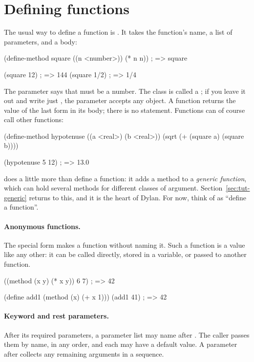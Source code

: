 \section{Defining functions}\label{sec:tut-functions}

The usual way to define a function is . It takes the
function's name, a list of parameters, and a body:

\begin{dylan}
(define-method square ((n <number>))
  (* n n))                      ; => square

(square 12)                     ; => 144
(square 1/2)                    ; => 1/4
\end{dylan}

The parameter  says that  must be a number. The
class is called a ; if you leave it out and write just
, the parameter accepts any object. A function returns the value of
the last form in its body; there is no  statement. Functions
can of course call other functions:

\begin{dylan}
(define-method hypotenuse ((a <real>) (b <real>))
  (sqrt (+ (square a) (square b))))

(hypotenuse 5 12)               ; => 13.0
\end{dylan}

 does a little more than define a function: it adds a
method to a \emph{generic function}, which can hold several methods for
different classes of argument. Section~\ref{sec:tut-generic} returns to
this, and it is the heart of Dylan. For now, think of
 as ``define a function''.

\paragraph{Anonymous functions.}
The special form  makes a function without naming it. Such a
function is a value like any other: it can be called directly, stored in
a variable, or passed to another function.

\begin{dylan}
((method (x y) (* x y)) 6 7)    ; => 42

(define add1 (method (x) (+ x 1)))
(add1 41)                       ; => 42
\end{dylan}

\paragraph{Keyword and rest parameters.}
After its required parameters, a parameter list may name  after . The caller passes them by name, in any
order, and each may have a default value. A parameter after 
collects any remaining arguments in a sequence.

